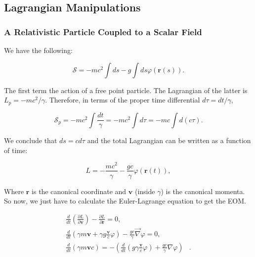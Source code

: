 
\subsection{Lagrangian Manipulations}

\newcommand{\matL}{\mathcal{L}}
\newcommand{\pu}[1]{\partial^{#1 }}
\newcommand{\pd}[1]{\partial_{#1 }}
\newcommand{\metu}[1]{\eta^{#1 }}
\newcommand{\metd}[1]{\eta_{#1 }}
\newcommand{\deltita}[2]{\delta^{#1 }_{#2}}
\newcommand{\vad}[1]{A_{#1 }}
\newcommand{\vau}[1]{A^{#1 }}

\subsubsection{A Relativistic Particle Coupled to a Scalar Field}\label{A Relativistic Particle Coupled to a Scalar Field}

We have the following:

\begin{equation}
	\mathcal{S}=-m c^{2} \int d s-g \int d s \varphi(\mathbf{r}(s)).
\end{equation}

The first term  the action of a free point particle. The Lagrangian of the latter is $L_{p}=-m c^{2} / \gamma$. Therefore, in terms of the proper time differential $d \tau=d t / \gamma$,

\begin{equation}
	\mathcal{S}_{p}=-m c^{2} \int \frac{d t}{\gamma}=-m c^{2} \int d \tau=-m c \int d(c \tau).
\end{equation}

We conclude that $ds=c d \tau$ and  the total Lagrangian can be written as a function of time:

\begin{equation}
	L=-\frac{m c^{2}}{\gamma}-\frac{g c}{\gamma} \varphi(\mathbf{r}(t)),
\end{equation}

Where $\textbf{r}$ is the canonical coordinate and $\textbf{v}$ (inside $\gamma$) is the canonical momenta. So now, we just have to calculate the Euler-Lagrange equation to get the EOM.

\begin{equation}
	\begin{split}
		\frac{d}{d t} \left(\frac{\partial L}{\partial \mathbf{v}}\right)-\frac{\partial L}{\partial \mathbf{r}}=0,&\\
		\frac{d}{d t}\left(\gamma m \mathbf{v}+\gamma g \frac{\mathbf{v}}{c} \varphi \right) - \frac{gc}{\gamma} \vec{\nabla} \varphi=0,&\\
		\frac{d}{d t} (\gamma m \mathbf{v} c)=-\left(\frac{d}{d t}\left(g \gamma \frac{\mathbf{v}}{c} \varphi\right)+\frac{g c}{\gamma} \nabla \varphi\right)&.
	\end{split}
\end{equation}


